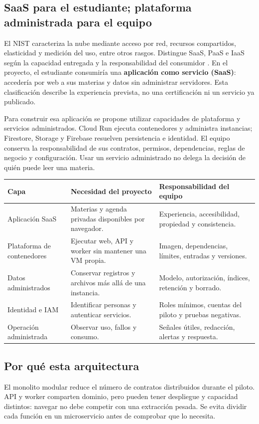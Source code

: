 \subsection{SaaS para el estudiante; plataforma administrada para el equipo}
El NIST caracteriza la nube mediante acceso por red, recursos compartidos, elasticidad y medición del uso, entre otros rasgos. Distingue SaaS, PaaS e IaaS según la capacidad entregada y la responsabilidad del consumidor \cite{nist}. En el proyecto, el estudiante consumiría una \textbf{aplicación como servicio (SaaS)}: accedería por web a sus materias y datos sin administrar servidores. Esta clasificación describe la experiencia prevista, no una certificación ni un servicio ya publicado.

Para construir esa aplicación se propone utilizar capacidades de plataforma y servicios administrados. Cloud Run ejecuta contenedores y administra instancias; Firestore, Storage y Firebase resuelven persistencia e identidad. El equipo conserva la responsabilidad de sus contratos, permisos, dependencias, reglas de negocio y configuración. Usar un servicio administrado no delega la decisión de quién puede leer una materia.

\begin{tabularx}{\linewidth}{P{2.6cm}Y Y}
\toprule
\textbf{Capa} & \textbf{Necesidad del proyecto} & \textbf{Responsabilidad del equipo}\\
\midrule
Aplicación SaaS & Materias y agenda privadas disponibles por navegador. & Experiencia, accesibilidad, propiedad y consistencia.\\
Plataforma de contenedores & Ejecutar web, API y worker sin mantener una VM propia. & Imagen, dependencias, límites, entradas y versiones.\\
Datos administrados & Conservar registros y archivos más allá de una instancia. & Modelo, autorización, índices, retención y borrado.\\
Identidad e IAM & Identificar personas y autenticar servicios. & Roles mínimos, cuentas del piloto y pruebas negativas.\\
Operación administrada & Observar uso, fallos y consumo. & Señales útiles, redacción, alertas y respuesta.\\
\bottomrule
\end{tabularx}

\subsection{Por qué esta arquitectura}
El monolito modular reduce el número de contratos distribuidos durante el piloto. API y worker comparten dominio, pero pueden tener despliegue y capacidad distintos: navegar no debe competir con una extracción pesada. Se evita dividir cada función en un microservicio antes de comprobar que lo necesita.

